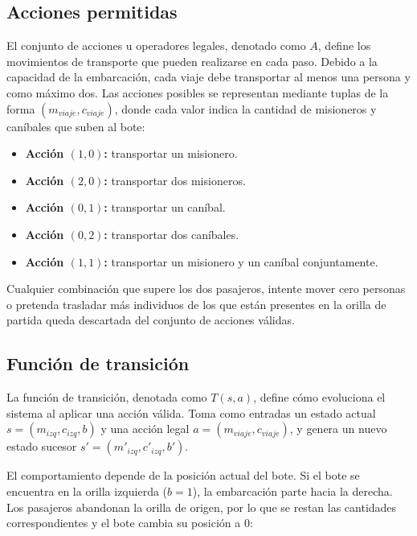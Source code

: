 \documentclass[
  spanish,
  11pt,
]{article}
\providecommand{\tightlist}{%
  \setlength{\itemsep}{0pt}\setlength{\parskip}{0pt}}
\begin{document}
\subsection{Acciones permitidas}\label{acciones-permitidas}

El conjunto de acciones u operadores legales, denotado como \(A\),
define los movimientos de transporte que pueden realizarse en cada paso.
Debido a la capacidad de la embarcación, cada viaje debe transportar al
menos una persona y como máximo dos. Las acciones posibles se
representan mediante tuplas de la forma \((m_{viaje},c_{viaje})\), donde
cada valor indica la cantidad de misioneros y caníbales que suben al
bote:

\begin{itemize}
\tightlist
\item
  \textbf{Acción \((1,0)\):} transportar un misionero.
\item
  \textbf{Acción \((2,0)\):} transportar dos misioneros.
\item
  \textbf{Acción \((0,1)\):} transportar un caníbal.
\item
  \textbf{Acción \((0,2)\):} transportar dos caníbales.
\item
  \textbf{Acción \((1,1)\):} transportar un misionero y un caníbal
  conjuntamente.
\end{itemize}

Cualquier combinación que supere los dos pasajeros, intente mover cero
personas o pretenda trasladar más individuos de los que están presentes
en la orilla de partida queda descartada del conjunto de acciones
válidas.

\subsection{Función de transición}\label{funciuxf3n-de-transiciuxf3n}

La función de transición, denotada como \(T(s,a)\), define cómo
evoluciona el sistema al aplicar una acción válida. Toma como entradas
un estado actual \(s=(m_{izq},c_{izq},b)\) y una acción legal
\(a=(m_{viaje},c_{viaje})\), y genera un nuevo estado sucesor
\(s'=(m'_{izq},c'_{izq},b')\).

El comportamiento depende de la posición actual del bote. Si el bote se
encuentra en la orilla izquierda (\(b=1\)), la embarcación parte hacia
la derecha. Los pasajeros abandonan la orilla de origen, por lo que se
restan las cantidades correspondientes y el bote cambia su posición a 0:
\end{document}
